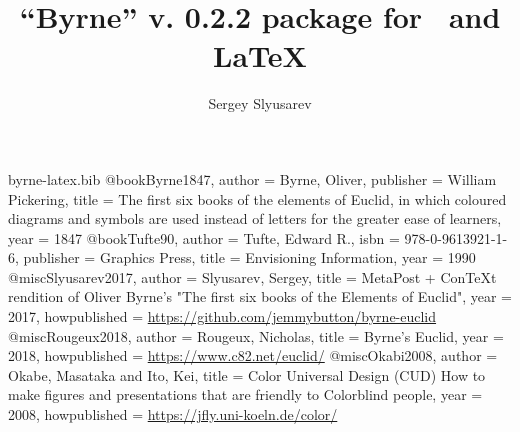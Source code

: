 \begin{filecontents}{byrne-latex.bib}
@book{Byrne1847,
  author = {Byrne, Oliver},
  publisher = {William Pickering},
  title = {{The first six books of the elements of Euclid, in which coloured diagrams and symbols are used instead of letters for the greater ease of learners}},
  year = 1847
}
@book{Tufte90,
  author = {Tufte, Edward R.},
  isbn = {978-0-9613921-1-6},
  publisher = {Graphics Press},
  title = {{Envisioning Information}},
  year = 1990
}
@misc{Slyusarev2017,
  author = {Slyusarev, Sergey},
  title = {{MetaPost + ConTeXt rendition of Oliver Byrne's "The first six books of the Elements of Euclid"}},
  year = {2017},
  howpublished = {\url{https://github.com/jemmybutton/byrne-euclid}}
}
@misc{Rougeux2018,
  author = {Rougeux, Nicholas},
  title = {{Byrne’s Euclid}},
  year = {2018},
  howpublished = {\url{https://www.c82.net/euclid/}}
}
@misc{Okabi2008,
  author = {Okabe, Masataka and Ito, Kei},
  title = {{Color Universal Design (CUD) How to make figures and presentations that are friendly to Colorblind people}},
  year = {2008},
  howpublished = {\url{https://jfly.uni-koeln.de/color/}}
}
\end{filecontents}

\documentclass{ltxdoc}
\usepackage{byrne}
\usepackage{ccicons,bxtexlogo,listings,hyperref}
\hypersetup{
     colorlinks=true,
     linkcolor=blue,
     filecolor=blue,
     citecolor = black,      
     urlcolor=cyan,
     }

\lstset{
language=MetaPost,
alsolanguage=TeX,
numbers=none,
basicstyle=\ttfamily\scriptsize
}

\def\mpPre{textLabels := true;}

\author{Sergey Slyusarev}
\title{``Byrne'' v. 0.2.2 package for \METAPOST\ and \LaTeX}


\maketitle

\begin{abstract}
This document describes ``Byrne'' package for \METAPOST\ and \LaTeX.
\end{abstract}

\begin{centering}

This document is distributed under CC-BY-SA 4.0 license 

\ccbysa 

\href{https://github.com/jemmybutton/byrne-latex}{https://github.com/jemmybutton/byrne-latex}

\end{centering}

